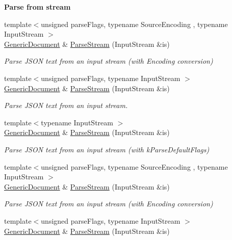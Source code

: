 \begin{Indent}{\bf Parse from stream}\par
\begin{DoxyCompactItemize}
\item 
{\footnotesize template$<$unsigned parse\+Flags, typename Source\+Encoding , typename Input\+Stream $>$ }\\\hyperlink{class_generic_document}{Generic\+Document} \& \hyperlink{class_generic_document_afe94c0abc83a20f2d7dc1ba7677e6238}{Parse\+Stream} (Input\+Stream \&is)
\begin{DoxyCompactList}\small\item\em Parse J\+S\+ON text from an input stream (with Encoding conversion) \end{DoxyCompactList}\item 
{\footnotesize template$<$unsigned parse\+Flags, typename Input\+Stream $>$ }\\\hyperlink{class_generic_document}{Generic\+Document} \& \hyperlink{class_generic_document_a6e154066c6f5024b91aaab25e03700e3}{Parse\+Stream} (Input\+Stream \&is)
\begin{DoxyCompactList}\small\item\em Parse J\+S\+ON text from an input stream. \end{DoxyCompactList}\item 
{\footnotesize template$<$typename Input\+Stream $>$ }\\\hyperlink{class_generic_document}{Generic\+Document} \& \hyperlink{class_generic_document_abe07ededbe9aaceb0058e3d254892b71}{Parse\+Stream} (Input\+Stream \&is)
\begin{DoxyCompactList}\small\item\em Parse J\+S\+ON text from an input stream (with k\+Parse\+Default\+Flags) \end{DoxyCompactList}\item 
{\footnotesize template$<$unsigned parse\+Flags, typename Source\+Encoding , typename Input\+Stream $>$ }\\\hyperlink{class_generic_document}{Generic\+Document} \& \hyperlink{class_generic_document_afe94c0abc83a20f2d7dc1ba7677e6238}{Parse\+Stream} (Input\+Stream \&is)
\begin{DoxyCompactList}\small\item\em Parse J\+S\+ON text from an input stream (with Encoding conversion) \end{DoxyCompactList}\item 
{\footnotesize template$<$unsigned parse\+Flags, typename Input\+Stream $>$ }\\\hyperlink{class_generic_document}{Generic\+Document} \& \hyperlink{class_generic_document_a6e154066c6f5024b91aaab25e03700e3}{Parse\+Stream} (Input\+Stream \&is)

\end{DoxyCompactItemize}
\end{Indent}
